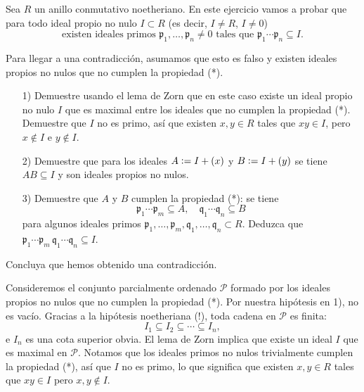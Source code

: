 \begin{ejercicio}
  Sea $R$ un anillo conmutativo noetheriano. En este ejercicio vamos a probar
  que para todo ideal propio no nulo $I \subset R$ (es decir, $I \ne R$,
  $I \ne 0$)
  \begin{equation}
    \tag{*}\text{existen ideales primos }\mathfrak{p}_1,\ldots,\mathfrak{p}_n\ne 0
    \text{ tales que }\mathfrak{p}_1\cdots \mathfrak{p}_n \subseteq I.
  \end{equation}

  Para llegar a una contradicción, asumamos que esto es falso y existen ideales
  propios no nulos que no cumplen la propiedad (*).

  \begin{enumerate}
  \item[1)] Demuestre usando el lema de Zorn que en este caso existe un ideal
    propio no nulo $I$ que es maximal entre los ideales que no cumplen
    la propiedad (*). Demuestre que $I$ no es primo, así que existen $x,y \in R$
    tales que $xy \in I$, pero $x \notin I$ e $y \notin I$.

  \item[2)] Demuestre que para los ideales $A \mathrel{\mathop:}= I + (x)$ y $B \mathrel{\mathop:}= I + (y)$
    se tiene $AB \subseteq I$ y son ideales propios no nulos.

  \item[3)] Demuestre que $A$ y $B$ cumplen la propiedad (*): se tiene
    \[ \mathfrak{p}_1\cdots \mathfrak{p}_m \subseteq A, \quad
       \mathfrak{q}_1\cdots \mathfrak{q}_n \subseteq B \]
    para algunos ideales primos
    $\mathfrak{p}_1,\ldots, \mathfrak{p}_m, \mathfrak{q}_1, \ldots,
    \mathfrak{q}_n \subset R$. Deduzca que
    $\mathfrak{p}_1\cdots \mathfrak{p}_m\,\mathfrak{q}_1\cdots\mathfrak{q}_n\subseteq I$.
  \end{enumerate}

  Concluya que hemos obtenido una contradicción.

  \ifdefined\solutions
  \begin{solucion}
    Consideremos el conjunto parcialmente ordenado $\mathcal{P}$ formado por
    los ideales propios no nulos que no cumplen la propiedad (*). Por nuestra
    hipótesis en 1), no es vacío. Gracias a la hipótesis noetheriana (!), toda
    cadena en $\mathcal{P}$ es finita:
    $$I_1 \subseteq I_2 \subseteq \cdots \subseteq I_n,$$
    e $I_n$ es una cota superior obvia. El lema de Zorn implica que existe un
    ideal $I$ que es maximal en $\mathcal{P}$. Notamos que los ideales primos no
    nulos trivialmente cumplen la propiedad (*), así que $I$ no es primo, lo que
    significa que existen $x,y\in R$ tales que $xy\in I$ pero $x,y\notin I$.


\end{solucion}
\end{ejercicio}
